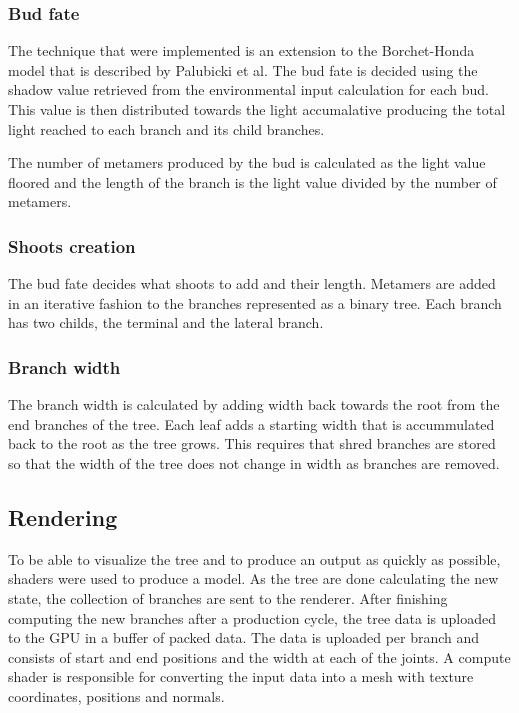 \documentclass[11pt]{article} %
\begin{document}
\subsubsection{Bud fate}
The technique that were implemented is an extension to the Borchet-Honda model that is described by Palubicki et al.\cite{Palubicki:2009:STM:1531326.1531364}
The bud fate is decided using the shadow value retrieved from the environmental input calculation for each bud.
This value is then distributed towards the light accumalative producing the total light reached to each branch and its child branches.

The number of metamers produced by the bud is calculated as the light value floored and the length of the branch is the light value divided by the number of metamers.

\subsubsection{Shoots creation}
The bud fate decides what shoots to add and their length.
Metamers are added in an iterative fashion to the branches represented as a binary tree.
Each branch has two childs, the terminal and the lateral branch.\cite{Palubicki:2009:STM:1531326.1531364}

\subsubsection{Branch width}
The branch width is calculated by adding width back towards the root from the end branches of the tree.
Each leaf adds a starting width that is accummulated back to the root as the tree grows.
This requires that shred branches are stored so that the width of the tree does not change in width as branches are removed.\cite{Palubicki:2009:STM:1531326.1531364}

\subsection{Rendering}
To be able to visualize the tree and to produce an output as quickly as possible, shaders were used to produce a model.
As the tree are done calculating the new state, the collection of branches are sent to the renderer.
After finishing computing the new branches after a production cycle, the tree data is uploaded to the GPU in a buffer of packed data.
The data is uploaded per branch and consists of start and end positions and the width at each of the joints.
A compute shader is responsible for converting the input data into a mesh with texture coordinates, positions and normals.
\end{document}
